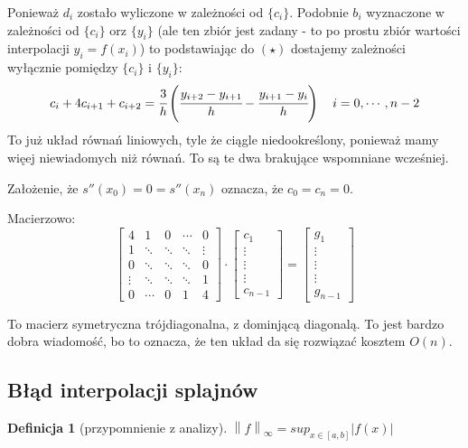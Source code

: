 \documentclass[hidelinks,a4paper,fleqn,oneside]{book}
\newcommand{\norm}[1]{\left\lVert#1\right\rVert}
\newtheorem{defi}{Definicja}
\begin{document}
Ponieważ $d_i$ zostało wyliczone w zależności od $\{c_i\}$. Podobnie $b_i$ wyznaczone w zależności od $\{c_i\}$ orz $\{y_i\}$ (ale ten zbiór jest zadany - to po prostu zbiór wartości interpolacji $y_i = f(x_i)$) to podstawiając do $(\star)$ dostajemy zależności wyłącznie pomiędzy $\{c_i\}$ i $\{y_i\}$:
\[
	c_i + 4c_{i+1} + c_{i+2} = \cfrac{3}{h}\left(\cfrac{y_{i+2} - y_{i+1}}{h} - \cfrac{y_{i+1} - y_i}{h}\right) \quad i = 0, \cdots, n-2
\]
To już układ równań liniowych, tyle że ciągle niedookreślony, ponieważ mamy więej niewiadomych niż równań. To są te dwa brakujące wspomniane wcześniej. 

Założenie, że $s''(x_0) = 0 = s''(x_n)$ oznacza, że $c_0 = c_n = 0$.

Macierzowo:
\[
	\left[
		\begin{array}{ccccc}
		4 & 1 & 0 & \cdots & 0 \\
		1 & \ddots & \ddots & \ddots & \vdots \\
		0 & \ddots & \ddots & \ddots & 0 \\
		\vdots & \ddots & \ddots & \ddots & 1 \\
		0 & \cdots & 0 & 1 & 4
		\end{array}
	\right]
	\cdot 
	\left[
		\begin{array}{c}
		c_1 \\
		\vdots \\
		\vdots \\
		\vdots \\
		c_{n-1}
		\end{array}
	\right]	
	=
	\left[
		\begin{array}{c}
		g_1 \\
		\vdots \\
		\vdots \\
		\vdots \\
		g_{n-1}
		\end{array}
	\right]	
\]

To macierz symetryczna trójdiagonalna, z dominjącą diagonalą. To jest bardzo dobra wiadomość, bo to oznacza, że ten układ da się rozwiązać kosztem $O(n)$.

\subsection{Błąd interpolacji splajnów} 

\begin{defi}[przypomnienie z analizy]
	$\norm{f}_\infty = sup_{x \in [a, b]}|f(x)|$
\end{defi}
\end{document}
